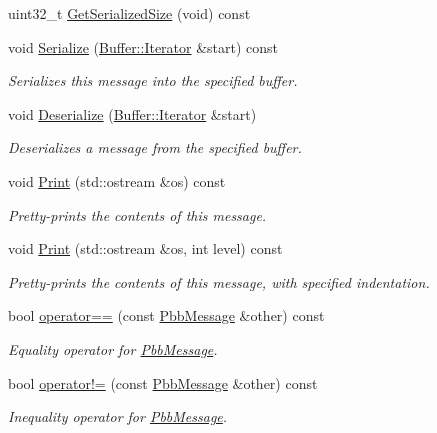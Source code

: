 \begin{DoxyCompactItemize}
uint32\+\_\+t \hyperlink{classns3_1_1PbbMessage_a3e64051ac20503ab0df923c4243e3ef6}{Get\+Serialized\+Size} (void) const 
\item 
void \hyperlink{classns3_1_1PbbMessage_a724c917f3c2bc5e248ba56115e065830}{Serialize} (\hyperlink{classns3_1_1Buffer_1_1Iterator}{Buffer\+::\+Iterator} \&start) const 
\begin{DoxyCompactList}\small\item\em Serializes this message into the specified buffer. \end{DoxyCompactList}\item 
void \hyperlink{classns3_1_1PbbMessage_a3944565e6d2d90e063fcc30287e941d8}{Deserialize} (\hyperlink{classns3_1_1Buffer_1_1Iterator}{Buffer\+::\+Iterator} \&start)
\begin{DoxyCompactList}\small\item\em Deserializes a message from the specified buffer. \end{DoxyCompactList}\item 
void \hyperlink{classns3_1_1PbbMessage_a83647841762fe9980e9daf0b0baaf83c}{Print} (std\+::ostream \&os) const 
\begin{DoxyCompactList}\small\item\em Pretty-\/prints the contents of this message. \end{DoxyCompactList}\item 
void \hyperlink{classns3_1_1PbbMessage_a4eeb8dbb919df90ac38c9413d97d6c85}{Print} (std\+::ostream \&os, int level) const 
\begin{DoxyCompactList}\small\item\em Pretty-\/prints the contents of this message, with specified indentation. \end{DoxyCompactList}\item 
bool \hyperlink{classns3_1_1PbbMessage_a3f4b1222cd0a2dd38fb46cf738e35d5d}{operator==} (const \hyperlink{classns3_1_1PbbMessage}{Pbb\+Message} \&other) const 
\begin{DoxyCompactList}\small\item\em Equality operator for \hyperlink{classns3_1_1PbbMessage}{Pbb\+Message}. \end{DoxyCompactList}\item 
bool \hyperlink{classns3_1_1PbbMessage_ab4ae5804bfbb5402df842a8cc4b2d42b}{operator!=} (const \hyperlink{classns3_1_1PbbMessage}{Pbb\+Message} \&other) const 
\begin{DoxyCompactList}\small\item\em Inequality operator for \hyperlink{classns3_1_1PbbMessage}{Pbb\+Message}. \end{DoxyCompactList}\end{DoxyCompactItemize}
